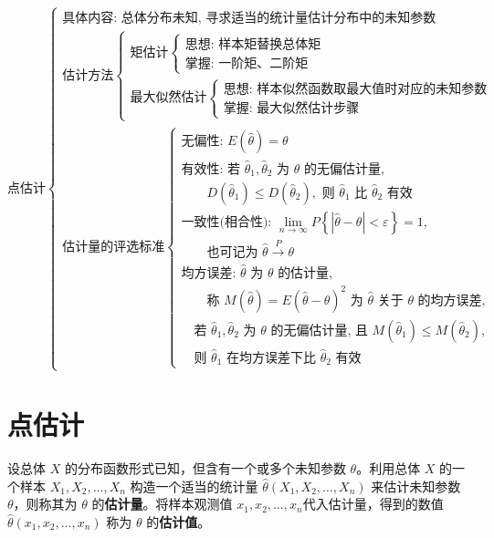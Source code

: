 \documentclass[lang=cn,11pt]{elegantbook}
\begin{document}
{\small
\[
\text{点估计}
\begin{cases}
\text{具体内容: 总体分布未知, 寻求适当的统计量估计分布中的未知参数} \\
\text{估计方法}
\begin{cases}
\text{矩估计}
\begin{cases}
\text{思想: 样本矩替换总体矩} \\
\text{掌握: 一阶矩、二阶矩}
\end{cases} \\
\text{最大似然估计}
\begin{cases}
\text{思想: 样本似然函数取最大值时对应的未知参数} \\
\text{掌握: 最大似然估计步骤}
\end{cases}
\end{cases} \\
\text{估计量的评选标准}
\begin{cases}
\text{无偏性: } E(\hat{\theta}) = \theta \\
\text{有效性: 若 } \hat{\theta}_1,\hat{\theta}_2 \text{ 为 } \theta \text{ 的无偏估计量,} \\
\qquad D(\hat{\theta}_1) \leq D(\hat{\theta}_2), \text{ 则 } \hat{\theta}_1 \text{ 比 } \hat{\theta}_2 \text{ 有效} \\
\text{一致性(相合性): } \lim\limits_{n \to \infty} P\left\{|\hat{\theta} - \theta| < \varepsilon\right\} = 1, \\
\qquad \text{也可记为 } \hat{\theta} \xrightarrow{P} \theta \\
\text{均方误差: } \hat{\theta} \text{ 为 } \theta \text{ 的估计量,} \\
\qquad \text{称 } M(\hat{\theta}) = E(\hat{\theta} - \theta)^2 \text{ 为 } \hat{\theta} \text{ 关于 } \theta \text{ 的均方误差}, \\
\quad \text{若 } \hat{\theta}_1,\hat{\theta}_2 \text{ 为 } \theta \text{ 的无偏估计量, 且 } M(\hat{\theta}_1) \leq M(\hat{\theta}_2), \\
\quad \text{则 } \hat{\theta}_1 \text{ 在均方误差下比 } \hat{\theta}_2 \text{ 有效}
\end{cases}
\end{cases}
\]
}


\section{点估计}

\begin{definition}[点估计] \label{def:point-est}
设总体 \(X\) 的分布函数形式已知，但含有一个或多个未知参数 \(\theta\)。利用总体 \(X\) 的一个样本 \(X_1, X_2, \dots, X_n\)
构造一个适当的统计量 \(\hat{\theta}(X_1, X_2, \dots, X_n)\) 
来估计未知参数 \(\theta\)，则称其为 \(\theta\) 的\textbf{估计量}。将样本观测值 \(x_1, x_2, \dots, x_n\)代入估计量，得到的数值 \(\hat{\theta}(x_1, x_2, \dots, x_n)\) 称为 \(\theta\) 的\textbf{估计值}。
\end{definition}
\end{document}
